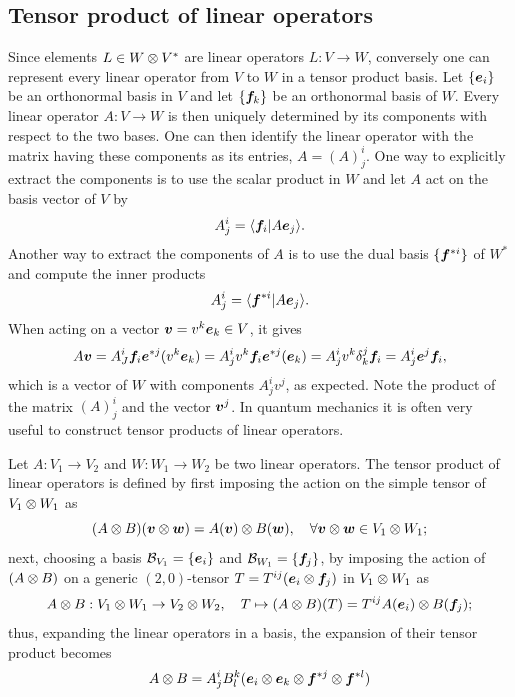 \subsection{Tensor product of linear operators}
Since elements $L \in W \otimes V^*$ are linear operators $L : V \to W$, conversely one can represent every linear operator from $V$ to $W$ in a tensor product basis. Let $\{\bm{e}_i\}$ be an orthonormal basis in $V$ and let $\{\bm{f}_k\}$ be an orthonormal basis of $W$. Every linear operator $A : V \to W$ is then uniquely determined by its components with respect to the two bases. One can then identify the linear operator with the matrix having these components as its entries, $A = (A)^i_j$. One way to explicitly extract the components is to use the scalar product in $W$ and let $A$ act on the basis vector of $V$ by
\begin{equation}
    A^i_j = \langle \bm{f}_i | A\bm{e}_j \rangle.
\end{equation}
Another way to extract the components of $A$ is to use the dual basis $\{\bm{f}^{*i}\}$ of $W^*$ and compute the inner products
\begin{equation}
    A^i_j = \langle \bm{f}^{*i} | A\bm{e}_j \rangle.
\end{equation}
When acting on a vector $\bm{v} = v^k\bm{e}_k \in V$, it gives
\begin{equation}
    A\bm{v} = A^i_J\bm{f}_i\bm{e}^{*j}(v^k\bm{e}_k) = A^i_jv^k\bm{f}_i\bm{e}^{*j}(\bm{e}_k) = A^i_jv^k\delta^j_k\bm{f}_i = A^i_j\bm{e}^j\bm{f}_i,
\end{equation}
which is a vector of $W$ with components $A^i_jv^j$, as expected. Note the product of the matrix $(A)^i_j$ and the vector $\bm{v}^j$. In quantum mechanics it is often very useful to construct tensor products of linear operators. 
\begin{defn}
    Let $A : V_1 \to V_2$ and $W : W_1 \to W_2$ be two linear operators. The tensor product of linear operators is defined by first imposing the action on the simple tensor of $V_1 \otimes W_1$ as
    \begin{equation}
        (A \otimes B)(\bm{v} \otimes \bm{w}) = A(\bm{v}) \otimes B(\bm{w}),\quad \forall \bm{v} \otimes \bm{w} \in V_1 \otimes W_1;
    \end{equation}
    next, choosing a basis $\mathcal{B}_{V_1} = \{\bm{e}_i\}$ and $\mathcal{B}_{W_1} = \{\bm{f}_j\}$, by imposing the action of $(A \otimes B)$ on a generic $(2,0)$-tensor $T = T^{ij}(\bm{e}_i \otimes \bm{f}_j)$ in $V_1 \otimes W_1$ as
    \begin{equation}
        A \otimes B : V_1 \otimes W_1 \to V_2 \otimes W_2,\quad T \mapsto (A \otimes B)(T) = T^{ij}A(\bm{e}_i) \otimes B(\bm{f}_j);
    \end{equation}
    thus, expanding the linear operators in a basis, the expansion of their tensor product becomes
    \begin{equation}
        A \otimes B = A^i_jB^k_l(\bm{e}_i \otimes \bm{e}_k \otimes \bm{f}^{*j} \otimes \bm{f}^{*l})
    \end{equation}
\end{defn}

